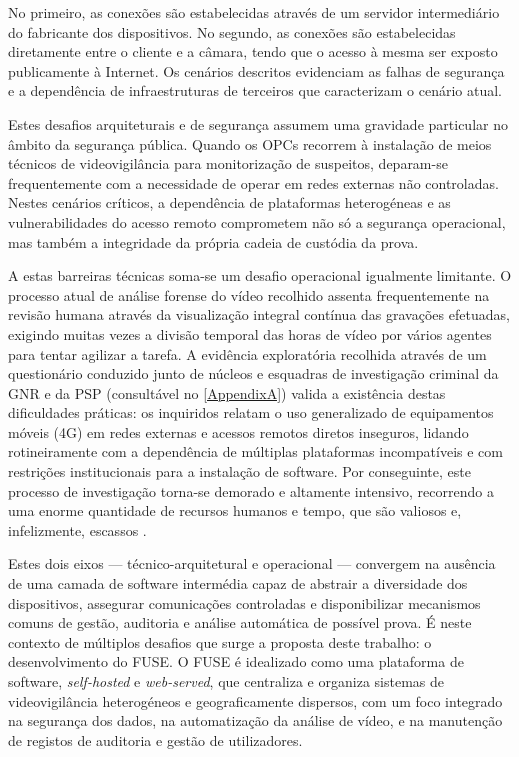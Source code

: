 No primeiro, as conexões são estabelecidas através de um servidor intermediário do fabricante dos dispositivos. No segundo, as conexões são estabelecidas diretamente entre o cliente e a câmara, tendo que o acesso à mesma ser exposto publicamente à Internet. Os cenários descritos evidenciam as falhas de segurança e a dependência de infraestruturas de terceiros que caracterizam o cenário atual.

Estes desafios arquiteturais e de segurança assumem uma gravidade particular no âmbito da segurança pública. Quando os \glspl{OPC} recorrem à instalação de meios técnicos de videovigilância para monitorização de suspeitos, deparam-se frequentemente com a necessidade de operar em redes externas não controladas. Nestes cenários críticos, a dependência de plataformas heterogéneas e as vulnerabilidades do acesso remoto comprometem não só a segurança operacional, mas também a integridade da própria cadeia de custódia da prova.

A estas barreiras técnicas soma-se um desafio operacional igualmente limitante. O processo atual de análise forense do vídeo recolhido assenta frequentemente na revisão humana através da visualização integral contínua das gravações efetuadas, exigindo muitas vezes a divisão temporal das horas de vídeo por vários agentes para tentar agilizar a tarefa. A evidência exploratória recolhida através de um questionário conduzido junto de núcleos e esquadras de investigação criminal da \gls{GNR} e da \gls{PSP} (consultável no \autoref{AppendixA}) valida a existência destas dificuldades práticas: os inquiridos relatam o uso generalizado de equipamentos móveis (4G) em redes externas e acessos remotos diretos inseguros, lidando rotineiramente com a dependência de múltiplas plataformas incompatíveis e com restrições institucionais para a instalação de software. Por conseguinte, este processo de investigação torna-se demorado e altamente intensivo, recorrendo a uma enorme quantidade de recursos humanos e tempo, que são valiosos e, infelizmente, escassos \cite{DN2024}.

Estes dois eixos — técnico-arquitetural e operacional — convergem na ausência de uma camada de software intermédia capaz de abstrair a diversidade dos dispositivos, assegurar comunicações controladas e disponibilizar mecanismos comuns de gestão, auditoria e análise automática de possível prova. É neste contexto de múltiplos desafios que surge a proposta deste trabalho: o desenvolvimento do \gls{FUSE}. O \gls{FUSE} é idealizado como uma plataforma de software, \textit{self-hosted} e \textit{web-served}, que centraliza e organiza sistemas de videovigilância heterogéneos e geograficamente dispersos, com um foco integrado na segurança dos dados, na automatização da análise de vídeo, e na manutenção de registos de auditoria e gestão de utilizadores.

